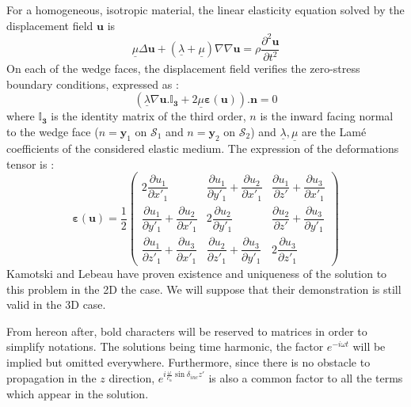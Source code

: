 For a homogeneous, isotropic material, the linear elasticity equation solved by the displacement field $\mathbf{u}$ is 
\begin{equation}
\underline{\mu} \Delta \mathbf{u} + (\underline{\lambda}+\underline{\mu})\nabla \nabla \mathbf{u} = \rho \frac{\partial^2 \mathbf{u}}{\partial t^2}
\label{C4:Elasticitelin}
\end{equation}
On each of the wedge faces, the displacement field verifies the zero-stress boundary conditions, expressed as :
\begin{equation}
(\underline{\lambda} \nabla \mathbf{u} .\mathbf{\mathbb{I}_3}+2\underline{\mu} \mathbf{\varepsilon} (\mathbf{u})).\mathbf{n}=0
\label{C4:stressfree}
\end{equation}
where $\mathbf{\mathbb{I}_3}$ is the identity matrix of the third order, $n$ is the inward facing normal to the wedge face ($n=\mathbf{y}_1$ on $\mathcal{S}_1$  and $n=\mathbf{y}_2$ on $\mathcal{S}_2$) and $\underline{\lambda}, \underline{\mu}$ are the Lamé coefficients of the considered elastic medium. The expression of the deformations tensor is :
\begin{equation}
\mathbf{\varepsilon}(\mathbf{u})=\frac{1}{2} \begin{pmatrix}
2\dfrac{\partial u_1}{\partial x'_1} & \dfrac{\partial u_1}{\partial y'_1}+\dfrac{\partial u_2}{\partial x'_1}&\dfrac{\partial u_1}{\partial z'}+\dfrac{\partial u_3}{\partial x'_1} \\
\dfrac{\partial u_1}{\partial y'_1}+\dfrac{\partial u_2}{\partial x'_1}&2\dfrac{\partial u_2}{\partial y'_1}&\dfrac{\partial u_2}{\partial z'}+\dfrac{\partial u_3}{\partial y'_1} \\
\dfrac{\partial u_1}{\partial z'_1}+\dfrac{\partial u_3}{\partial x'_1} &\dfrac{\partial u_2}{\partial z'_1}+\dfrac{\partial u_3}{\partial y'_1} & 2\dfrac{\partial u_3}{\partial z'_1}
\end{pmatrix}
\end{equation}
Kamotski and Lebeau \cite{KamotskiLebeau} have proven existence and uniqueness of the solution to this problem in the 2D the case. We will suppose that their demonstration is still valid in the 3D case.

From hereon after, bold characters will be reserved to matrices in order to simplify notations. The solutions being time harmonic, the factor $e^{-i\omega t}$ will be implied but omitted everywhere. Furthermore, since there is no obstacle to propagation in the $z$ direction, $e^{i\frac{\omega}{c_{\alpha}}\sin\delta_{inc}z'}$ is also a common factor to all the terms which appear in the solution.


